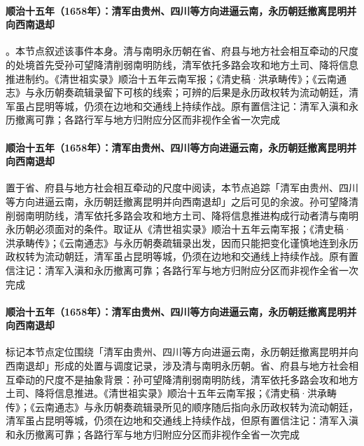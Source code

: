 \paragraph{顺治十五年（1658年）：清军由贵州、四川等方向进逼云南，永历朝廷撤离昆明并向西南退却}
。本节点叙述该事件本身。清与南明永历朝在省、府县与地方社会相互牵动的尺度的处境首先受孙可望降清削弱南明防线，清军依托多路会攻和地方土司、降将信息推进制约。《清世祖实录》顺治十五年云南军报；《清史稿·洪承畴传》；《云南通志》与永历朝奏疏辑录留下可核的线索；可辨的后果是永历政权转为流动朝廷，清军虽占昆明等城，仍须在边地和交通线上持续作战。原有置信注记：清军入滇和永历撤离可靠；各路行军与地方归附应分区而非视作全省一次完成

\paragraph{顺治十五年（1658年）：清军由贵州、四川等方向进逼云南，永历朝廷撤离昆明并向西南退却}
 置于省、府县与地方社会相互牵动的尺度中阅读，本节点追踪「清军由贵州、四川等方向进逼云南，永历朝廷撤离昆明并向西南退却」之后可见的余波。孙可望降清削弱南明防线，清军依托多路会攻和地方土司、降将信息推进构成行动者清与南明永历朝必须面对的条件。取证从《清世祖实录》顺治十五年云南军报；《清史稿·洪承畴传》；《云南通志》与永历朝奏疏辑录出发，因而只能把变化谨慎地连到永历政权转为流动朝廷，清军虽占昆明等城，仍须在边地和交通线上持续作战。原有置信注记：清军入滇和永历撤离可靠；各路行军与地方归附应分区而非视作全省一次完成

\paragraph{顺治十五年（1658年）：清军由贵州、四川等方向进逼云南，永历朝廷撤离昆明并向西南退却}
 标记本节点定位围绕「清军由贵州、四川等方向进逼云南，永历朝廷撤离昆明并向西南退却」形成的处置与调度记录，涉及清与南明永历朝。省、府县与地方社会相互牵动的尺度不是抽象背景：孙可望降清削弱南明防线，清军依托多路会攻和地方土司、降将信息推进。《清世祖实录》顺治十五年云南军报；《清史稿·洪承畴传》；《云南通志》与永历朝奏疏辑录所见的顺序随后指向永历政权转为流动朝廷，清军虽占昆明等城，仍须在边地和交通线上持续作战，但原有置信注记：清军入滇和永历撤离可靠；各路行军与地方归附应分区而非视作全省一次完成

